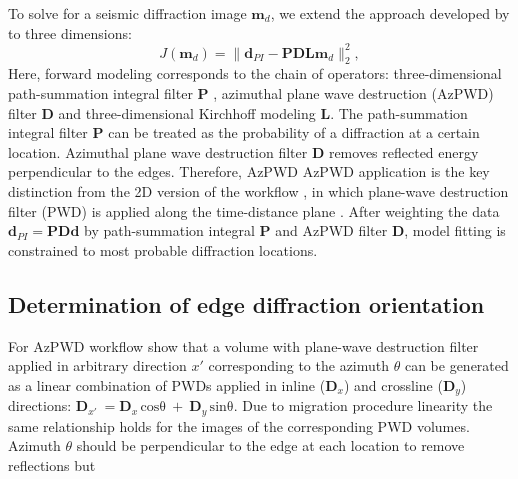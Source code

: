 To solve for a seismic diffraction image $\mathbf{m}_d$, we extend the approach developed by \cite{merzlikin2016least} to three dimensions: 
\begin{equation}
\label{eq:chain}
J(\mathbf{m}_d) = \|\mathbf{d}_{PI} - \mathbf{PDL}\mathbf{m}_d\|_{2}^{2},
\end{equation}
Here, forward modeling corresponds to the chain of operators: three-dimensional path-summation integral filter $\mathbf{P}$ \cite[]{merzlikin15,merzlikin17}, 
azimuthal plane wave destruction (AzPWD) filter $\mathbf{D}$ \cite[]{merzlikin2016diffraction,merzlikin2017diffraction} and three-dimensional Kirchhoff modeling $\mathbf{L}$.
The path-summation integral filter $\mathbf{P}$ can be treated as the probability
of a diffraction at a certain location. Azimuthal plane wave destruction filter $\mathbf{D}$
removes reflected energy perpendicular to the edges.
Therefore, AzPWD
AzPWD application is the key distinction from the 2D version of the workflow \cite[]{merzlikin2016least}, in which
plane-wave destruction filter (PWD) \cite[]{fomel02} is applied along the time-distance
plane \cite[]{fomel07,merzlikin2018ad}.
After weighting the data $\mathbf{d}_{PI} = \mathbf{PDd}$
by path-summation integral $\mathbf{P}$ and AzPWD filter $\mathbf{D}$, model fitting is constrained to most probable diffraction locations.

\subsection{Determination of edge diffraction orientation}
For AzPWD workflow \cite{merzlikin2016diffraction,merzlikin2017diffraction} show that a volume with plane-wave destruction filter
applied in arbitrary direction $x'$ corresponding to the azimuth $\theta$ can be generated as a linear combination of
PWDs applied in inline ($\mathbf{D}_x$) and crossline ($\mathbf{D}_y$) directions: $\mathbf{D}_{x'}\ = \mathbf{D}_{x}\,\mathrm{cos\theta}\ +\ \mathbf{D}_{y}\,\mathrm{sin\theta}$. Due to migration procedure linearity the same
relationship holds for the images of the corresponding PWD volumes.
Azimuth $\theta$ should be perpendicular to the edge at each location to remove reflections but

